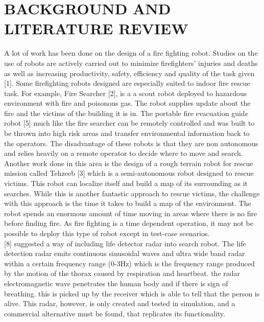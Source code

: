 \section{BACKGROUND AND LITERATURE REVIEW}\label{Sec:intro}
A lot of work has been done on the design of a fire fighting robot. Studies on the use of robots are actively carried out to minimize firefighters’ injuries and deaths as well as increasing productivity, safety, efficiency and quality of the task given [1]. Some firefighting robots designed are especially suited to indoor fire rescue task. For example, Fire Searcher [2], is a a scout robot deployed to hazardous environment with fire and poisonous gas. The robot supplies update about the fire and the victims of the building it is in. The portable fire evacuation guide robot [5] much like the fire searcher can be remotely controlled and was built to be thrown into high risk areas and transfer environmental information back to the operators. The disadvantage of these robots is that they are non autonomous and relies heavily on a remote operator to decide where to move and search.\\

Another work done in this area is the design of a rough terrain robot for rescue mission called Tehzeeb [3] which is a semi-autonomous robot designed to rescue victims. This robot can localize itself and build a map of its surrounding as it searches. While this is another fantastic approach to rescue victims, the challenge with this approach is the time it takes to build a map of the environment. The robot spends an enormous amount of time moving in areas where there is no fire before finding fire. As fire fighting is a time dependent operation, it may not be possible to deploy this type of robot except in test-case scenarios.\\


[8] suggested a way of including life detector radar into search robot. The life detection radar emits continuous sinusoidal waves and ultra wide band radar within a certain frequency range  (0-3Hz) which is the frequency range produced by the motion of the thorax caused by respiration and heartbeat. the radar electromagnetic wave penetrates the human body and if there is sign of breathing. this is picked up by the receiver which is able to tell that the person is alive. This radar, however, is only created and tested in simulation, and a commercial alternative must be found, that replicates its functionality.\\

